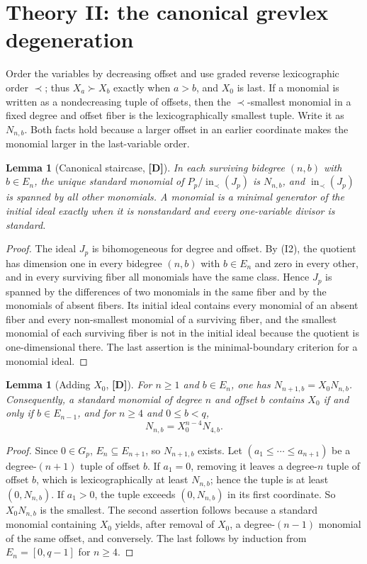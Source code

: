 \documentclass[11pt]{article}
\newtheorem{lemma}[theorem]{Lemma}
\theoremstyle{definition}
\theoremstyle{remark}
\newcommand{\mD}{\textbf{[D]}}
\begin{document}
\section{Theory II: the canonical grevlex degeneration}\label{sec:theory-b}

Order the variables by decreasing offset and use graded reverse lexicographic order $\prec$;
thus $X_a\succ X_b$ exactly when $a>b$, and $X_0$ is last. If a monomial is written as a
nondecreasing tuple of offsets, then the $\prec$-smallest monomial in a fixed degree and offset
fiber is the lexicographically smallest tuple. Write it as $N_{n,b}$. Both facts hold because
a larger offset in an earlier coordinate makes the monomial larger in the last-variable order.

\begin{lemma}[Canonical staircase, \mD]\label{lem:staircase}
In each surviving bidegree $(n,b)$ with $b\in E_n$, the unique standard monomial of
$P_p/\operatorname{in}_{\prec}(J_p)$ is $N_{n,b}$, and $\operatorname{in}_\prec(J_p)$ is spanned by
all other monomials. A monomial is a minimal generator of the initial ideal exactly when it is
nonstandard and every one-variable divisor is standard.
\end{lemma}

\begin{proof}
The ideal $J_p$ is bihomogeneous for degree and offset. By (I2), the quotient has dimension one
in every bidegree $(n,b)$ with $b\in E_n$ and zero in every other, and in every surviving
fiber all monomials have the same class. Hence $J_p$ is spanned by the differences of two
monomials in the same fiber and by the monomials of absent fibers. Its initial ideal contains
every monomial of an absent fiber and every non-smallest monomial of a surviving fiber, and the
smallest monomial of each surviving fiber is not in the initial ideal because the quotient
is one-dimensional there. The last assertion is the minimal-boundary criterion for a monomial
ideal.
\end{proof}

\begin{lemma}[Adding $X_0$, \mD]\label{lem:x0}
For $n\geq1$ and $b\in E_n$, one has $N_{n+1,b}=X_0N_{n,b}$. Consequently, a standard
monomial of degree $n$ and offset $b$ contains $X_0$ if and only if $b\in E_{n-1}$, and for
$n\geq4$ and $0\leq b<q$,
\[
 N_{n,b}=X_0^{n-4}N_{4,b}.
\]
\end{lemma}

\begin{proof}
Since $0\in G_p$, $E_n\subseteq E_{n+1}$, so $N_{n+1,b}$ exists. Let $(a_1\leq\cdots\leq a_{n+1})$ be
a degree-$(n+1)$ tuple of offset $b$. If $a_1=0$, removing it leaves a degree-$n$ tuple of
offset $b$, which is lexicographically at least $N_{n,b}$; hence the tuple is at least
$(0,N_{n,b})$. If $a_1>0$, the tuple exceeds $(0,N_{n,b})$ in its first coordinate. So
$X_0N_{n,b}$ is the smallest. The second assertion follows because a standard monomial
containing $X_0$ yields, after removal of $X_0$, a degree-$(n-1)$ monomial of the same offset,
and conversely. The last follows by induction from $E_n=[0,q-1]$ for $n\geq4$.
\end{proof}
\end{document}
